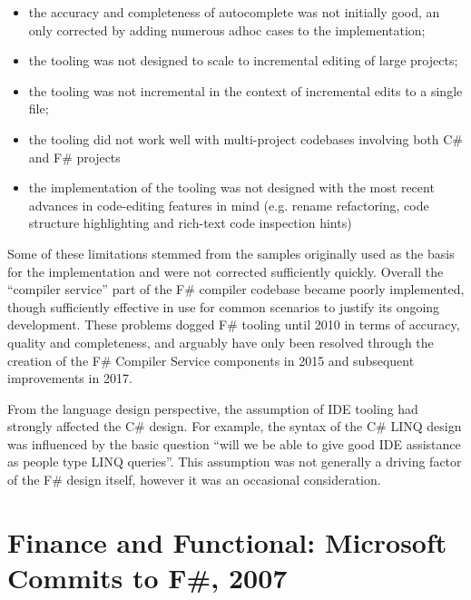 \documentclass[acmsmall,review]{acmart}\settopmatter{printfolios=true,printccs=false,printacmref=false}
\begin{document}
\begin{itemize}
\item the accuracy and completeness of autocomplete was not initially good, an only corrected by adding numerous adhoc cases to the implementation;
\item the tooling was not designed to scale to incremental editing of large projects;
\item the tooling was not incremental in the context of incremental edits to a single file;
\item the tooling did not work well with multi-project codebases involving both C\# and F\# projects
\item the implementation of the tooling was not designed with the most recent advances in code-editing features in mind (e.g. rename refactoring, code structure highlighting and rich-text code inspection hints) 
\end{itemize}

Some of these limitations stemmed from the samples originally used as the basis for the implementation and were not
corrected sufficiently quickly.  Overall the “compiler service” part of the F\# compiler codebase became poorly implemented,
though sufficiently effective in use for common scenarios to justify its ongoing development.  These problems
dogged F\# tooling until 2010 in terms of accuracy, quality and completeness, and arguably have only been resolved
through the creation of the F\# Compiler Service components in 2015 and subsequent improvements in 2017.  

From the language design perspective, the assumption of IDE tooling had strongly affected the C\# design.  For
example, the syntax of the C\# LINQ design was influenced by the basic question “will we be able to give good
IDE assistance as people type LINQ queries”.  This assumption was not generally a driving factor of the F\# design itself, however it was an occasional consideration.



\section*{Finance and Functional: Microsoft Commits to F\#, 2007}
\end{document}
